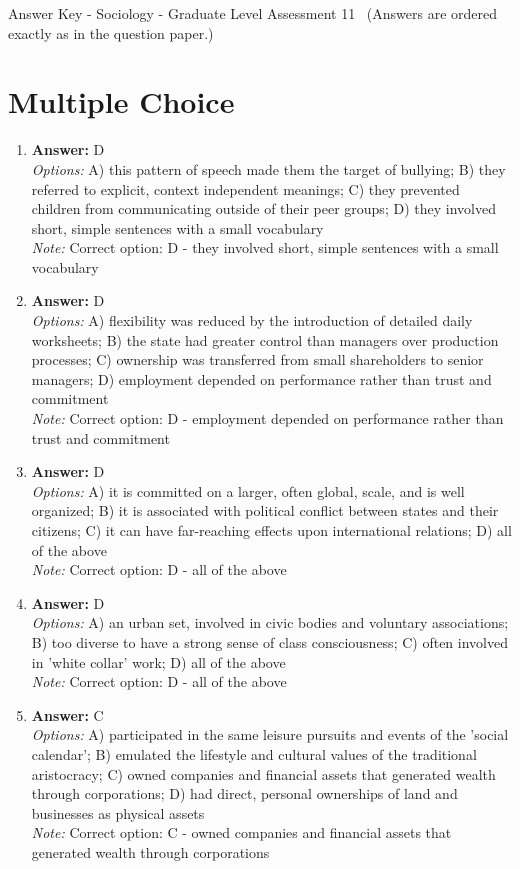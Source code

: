 \documentclass[12pt]{article}
\begin{document}
\begin{center}
Answer Key - Sociology - Graduate Level Assessment 11 \
\small (Answers are ordered exactly as in the question paper.)
\end{center}

\section*{Multiple Choice}
\begin{enumerate}[label=\arabic*.]
\item \textbf{Answer:} D
\\ \textit{Options:} A) this pattern of speech made them the target of bullying; B) they referred to explicit, context independent meanings; C) they prevented children from communicating outside of their peer groups; D) they involved short, simple sentences with a small vocabulary
\\ \textit{Note:} Correct option: D - they involved short, simple sentences with a small vocabulary
\item \textbf{Answer:} D
\\ \textit{Options:} A) flexibility was reduced by the introduction of detailed daily worksheets; B) the state had greater control than managers over production processes; C) ownership was transferred from small shareholders to senior managers; D) employment depended on performance rather than trust and commitment
\\ \textit{Note:} Correct option: D - employment depended on performance rather than trust and commitment
\item \textbf{Answer:} D
\\ \textit{Options:} A) it is committed on a larger, often global, scale, and is well organized; B) it is associated with political conflict between states and their citizens; C) it can have far-reaching effects upon international relations; D) all of the above
\\ \textit{Note:} Correct option: D - all of the above
\item \textbf{Answer:} D
\\ \textit{Options:} A) an urban set, involved in civic bodies and voluntary associations; B) too diverse to have a strong sense of class consciousness; C) often involved in 'white collar' work; D) all of the above
\\ \textit{Note:} Correct option: D - all of the above
\item \textbf{Answer:} C
\\ \textit{Options:} A) participated in the same leisure pursuits and events of the 'social calendar'; B) emulated the lifestyle and cultural values of the traditional aristocracy; C) owned companies and financial assets that generated wealth through corporations; D) had direct, personal ownerships of land and businesses as physical assets
\\ \textit{Note:} Correct option: C - owned companies and financial assets that generated wealth through corporations
\end{enumerate}
\end{document}
